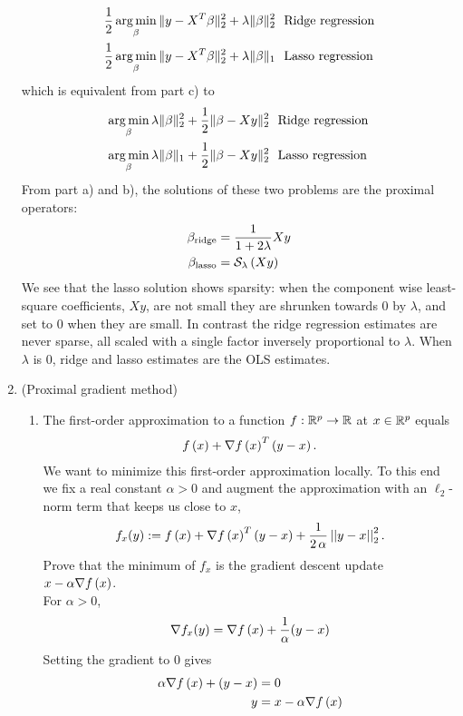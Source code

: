 \documentclass[12pt,twoside]{article}
\begin{document}
\begin{enumerate}
\begin{align*}
\frac{1}{2} \operatorname*{arg\,min}_\beta \| y - X^T \beta\|_2^2 + \lambda \|\beta\|_2^2	& \text{~ Ridge regression} \\
\frac{1}{2} \operatorname*{arg\,min}_\beta \| y - X^T \beta\|_2^2 + \lambda \|\beta\|_1	& \text{~ Lasso regression}
\end{align*} 
which is equivalent from part c) to
\begin{align*}
 \operatorname*{arg\,min}_\beta  \lambda \|\beta\|_2^2 + \frac{1}{2} \| \beta - X y \|_2^2 	& \text{~ Ridge regression} \\
 \operatorname*{arg\,min}_\beta   \lambda \|\beta\|_1+    \frac{1}{2} \| \beta - X y \|_2^2 	& \text{~ Lasso regression}
\end{align*} 
From part a) and b), the solutions of these two problems are the proximal operators:
\begin{align*}
	\beta_{\text{ridge}}	&= 	 \frac{1} {1+2 \lambda} X y \\
	\beta_{\text{lasso}}	&= 	  \mathcal{ S }_{\lambda}\left( X y \right)\\
\end{align*} 
We see that the lasso solution shows sparsity: when the component wise least-square coefficients, $X y$, are not small they are shrunken towards $0$ by $\lambda$, and set to $0$ when they are small.
In contrast the ridge regression estimates are never sparse, all scaled with a single factor inversely proportional to $\lambda$. When $\lambda$ is $0$, ridge and lasso estimates are the OLS estimates.
 
 \newpage
  \item (Proximal gradient method)   
 \begin{enumerate}
 \item The first-order approximation to a function $f:\mathbb{R}^{p}\rightarrow \mathbb{R}$ at $x \in \mathbb{R}^{p}$ equals
 \begin{align}
f\left( x \right) + \nabla f\left( x \right)^T\left( y-x \right). 
\end{align}
We want to minimize this first-order approximation locally. To this end we fix a real constant $\alpha >0$ and augment the approximation with an $\ell_2$-norm term that keeps us close to $x$,
 \begin{align}
f_{x}(y) :=f\left( x \right) + \nabla f\left( x \right)^T\left( y-x \right) +  \frac{1}{2 \, \alpha }\left|\left| y-x \right|\right| _{2}^2.
\end{align}
 Prove that the minimum of $f_{x}$ is the gradient descent update $x- \alpha \nabla f\left( x \right)$.\\
 For $\alpha > 0$,
 \begin{align*}
 	\nabla f_{x}(y) &= \nabla f\left( x \right) +   \frac{1}{\alpha } (y - x) \\
 \end{align*} 
 Setting the gradient to $0$ gives
 \begin{align*}
 	\alpha \nabla f\left( x \right) + (y - x)  &= 0\\
	y &= x - \alpha \nabla f\left( x \right) \\
 \end{align*} 
 

\end{enumerate}
\end{enumerate}
\end{document}
